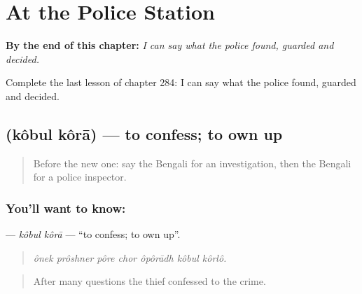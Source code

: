 
\chapter{At the Police Station}
\label{ch:bn-at-the-police-station}

\begin{chapteropening}
\textbf{By the end of this chapter:} \emph{I can say what the police found, guarded and decided.}

Complete the last lesson of chapter 284: I can say what the police found, guarded and decided.
\end{chapteropening}

\section[\texorpdfstring{\bn{কবুল} \bn{করা} (kôbul kôrā)}{কবুল করা (kôbul kôrā)}]{  (kôbul kôrā) — to confess; to own up}

\label{lesson:BN-C284-kobul-kora}



\begin{quote}
Before the new one: say the Bengali for an investigation, then the Bengali for a police inspector.
\end{quote}

\subsection*{You'll want to know:  }
\textbf{ } — \emph{kôbul kôrā} — \textquotedblleft{}to confess; to own up\textquotedblright{}.

\begin{quote}
      
\end{quote}

\begin{quote}
\emph{ônek prôshner pôre chor ôpôrādh kôbul kôrlô.}
\end{quote}

\begin{quote}
After many questions the thief confessed to the crime.
\end{quote}

